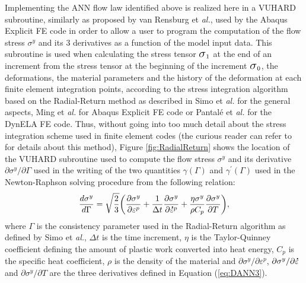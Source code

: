 \documentclass[algorithms,article,submit,pdftex,moreauthors]{Definitions/mdpi}
\makeatletter
\DeclareRobustCommand{\Sig}{\mbox{\Large\ensuremath{\sigma}}}
\DeclareRobustCommand{\mdot}[1]{\accentset{\mbox{\bfseries .}}{#1}}
\DeclareRobustCommand{\eal}{et \emph{al.}\@\xspace}
\makeatother
\begin{document}
Implementing the ANN flow law identified above is realized here in a VUHARD subroutine, similarly as proposed by van Rensburg \eal \cite{JansenVanRensburg-2012}, used by the Abaqus Explicit FE code in order to allow a user to program the computation of the flow stress $\sigma^y$ and its 3 derivatives as a function of the model input data.
This subroutine is used when calculating the stress tensor $\Sig_1$ at the end of an increment from the stress tensor at the beginning of the increment $\Sig_0$, the deformations, the material parameters and the history of the deformation at each finite element integration points, according to the stress integration algorithm based on the Radial-Return method as described in Simo \eal \cite{Simo-1998} for the general aspects, Ming \eal \cite{Ming-2018} for Abaqus Explicit FE code or Pantalé \eal \cite{Pantale-2004} for the DynELA FE code.
Thus, without going into too much detail about the stress integration scheme used in finite element codes (the curious reader can refer to \cite{Ponthot-2002, Ming-2018, Pantale-2004, Liang-2022} for details about this method), Figure \ref{fig:RadialReturn} shows the location of the VUHARD subroutine used to compute the flow stress $\sigma^y$ and its derivative $\partial\sigma^y/\partial\Gamma$ used in the writing of the two quantities $\gamma(\Gamma)$ and $\gamma^{'}(\Gamma)$ used in the Newton-Raphson solving procedure from the following relation:
\begin{equation}
\frac{d\sigma^{y}}{d\Gamma} = \sqrt{\frac{2}{3}}\left(\frac{\partial\sigma^{y}}{\partial\varepsilon^{p}}+\frac{1}{\Delta t}\frac{\partial\sigma^{y}}{\partial\mdot{\varepsilon}^p}+\frac{\eta\sigma^{y}}{\rho C_{p}}\frac{\partial\sigma^{y}}{\partial T}\right)\label{eq:derivatives},
\end{equation}
where $\Gamma$ is the consistency parameter used in the Radial-Return algorithm as defined by Simo \eal \cite{Simo-1998}, $\Delta t$ is the time increment, $\eta$ is the Taylor-Quinney coefficient defining the amount of plastic work converted into heat energy, $C_{p}$ is the specific heat coefficient, $\rho$ is the density of the material and $\partial \sigma^y/\partial\varepsilon^p$, $\partial \sigma^y/\partial\mdot\varepsilon$ and $\partial \sigma^y/\partial T$ are the three derivatives defined in Equation (\ref{eq:DANN3}).
\end{document}
